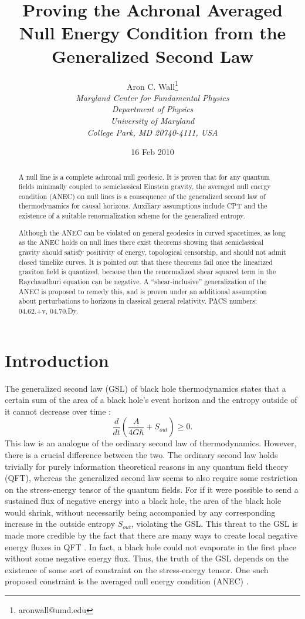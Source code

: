 \documentclass[11pt]{article}
\author{Aron C. Wall\footnote{aronwall@umd.edu}
\\ \textit{Maryland Center for Fundamental Physics} \\ \textit{Department of Physics} \\ \textit{University of Maryland} \\ \textit{College Park, MD 20740-4111, USA} }
\title{Proving the Achronal Averaged Null Energy Condition from the Generalized Second Law}
\date{16 Feb 2010 }
\begin{document}
\maketitle

\begin{abstract}
A null line is a complete achronal null geodesic.  It is proven that for any quantum fields minimally coupled to semiclassical Einstein gravity, the averaged null energy condition (ANEC) on null lines is a consequence of the generalized second law of thermodynamics for causal horizons.  Auxiliary assumptions include CPT and the existence of a suitable renormalization scheme for the generalized entropy.

Although the ANEC can be violated on general geodesics in curved spacetimes, as long  as the ANEC holds on null lines there exist theorems showing that semiclassical gravity should satisfy positivity of energy, topological censorship, and should not admit closed timelike curves.  It is pointed out that these theorems fail once the linearized graviton field is quantized, because then the renormalized shear squared term in the Raychaudhuri equation can be negative.  A ``shear-inclusive'' generalization of the ANEC is proposed to remedy this, and is proven under an additional assumption about perturbations to horizons in classical general relativity.
\newline\newline
PACS numbers: 04.62.+v, 04.70.Dy.
\end{abstract}

\newpage

\section{Introduction}\label{intro}

The generalized second law (GSL) of black hole thermodynamics states that a certain sum of the area of a black hole's event horizon and the entropy outside of it cannot decrease over time \cite{hawking75}:
\begin{equation}
\frac{d}{dt}(\frac{A}{4G\hbar} + S_{out}) \ge 0.
\end{equation}
This law is an analogue of the ordinary second law of thermodynamics.  However, there is a crucial difference between the two.  The ordinary second law holds trivially for purely information theoretical reasons in any quantum field theory (QFT), whereas the generalized second law seems to also require some restriction on the stress-energy tensor of the quantum fields.  For if it were possible to send a sustained flux of negative energy into a black hole, the area of the black hole would shrink, without necessarily being accompanied by any corresponding increase in the outside entropy $S_{out}$, violating the GSL.  This threat to the GSL is made more credible by the fact that there are many ways to create local negative energy fluxes in QFT \cite{BM69}.  In fact, a black hole could not evaporate in the first place without some negative energy flux.  Thus, the truth of the GSL depends on the existence of some sort of constraint on the stress-energy tensor.  One such proposed constraint is the averaged null energy condition (ANEC) \cite{borde87}\cite{roman88}.
\end{document}
